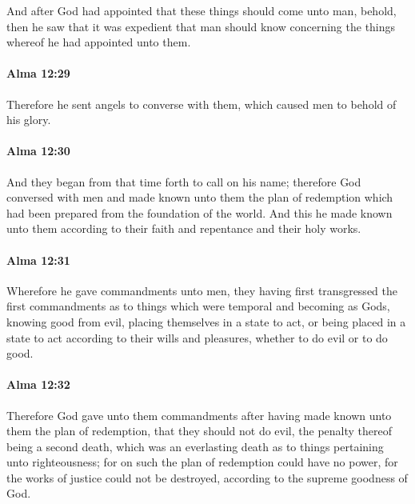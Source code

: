 			And after God had appointed that these things should come unto man,
			behold, then he saw that it was expedient
			that man should know concerning the things
			whereof he had appointed unto them.

		\paragraph{Alma 12:29} %
			\label{ALMA-12-29}

			Therefore he sent angels to converse with them,
			which caused men to behold of his glory.

		\paragraph{Alma 12:30} %
			\label{ALMA-12-30}

			And they began from that time forth to call on his name;
			therefore God conversed with men
			and made known unto them the plan of redemption
			which had been prepared from the foundation of the world.
			And this he made known unto them
			according to their faith and repentance and their holy works.

		\paragraph{Alma 12:31} %
			\label{ALMA-12-31}

			Wherefore he gave commandments unto men,
			they having first transgressed the first commandments
			as to things which were temporal
			and becoming as Gods,
			knowing good from evil,
			placing themselves in a state to act,
			or being placed in a state to act according to their wills and pleasures,
			whether to do evil or to do good.

		\paragraph{Alma 12:32} %
			\label{ALMA-12-32}

			Therefore God gave unto them commandments
			after having made known unto them the plan of redemption,
			that they should not do evil,
			the penalty thereof being a second death,
			which was an everlasting death as to things pertaining unto righteousness;
			for on such the plan of redemption could have no power,
			for the works of justice could not be destroyed,
			according to the supreme goodness of God.


